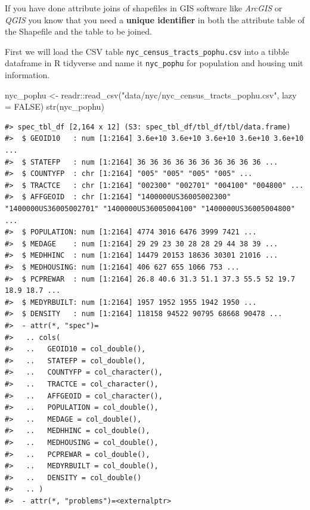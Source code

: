 \documentclass[
  11pt,
]{book}
\newenvironment{Shaded}{\begin{snugshade}}{\end{snugshade}}
\newcommand{\AttributeTok}[1]{\textcolor[rgb]{0.77,0.63,0.00}{#1}}
\newcommand{\ConstantTok}[1]{\textcolor[rgb]{0.00,0.00,0.00}{#1}}
\newcommand{\FunctionTok}[1]{\textcolor[rgb]{0.00,0.00,0.00}{#1}}
\newcommand{\NormalTok}[1]{#1}
\newcommand{\OtherTok}[1]{\textcolor[rgb]{0.56,0.35,0.01}{#1}}
\newcommand{\SpecialCharTok}[1]{\textcolor[rgb]{0.00,0.00,0.00}{#1}}
\newcommand{\StringTok}[1]{\textcolor[rgb]{0.31,0.60,0.02}{#1}}
\begin{document}
If you have done attribute joins of shapefiles in GIS software like \emph{ArcGIS} or \emph{QGIS} you know that you need a \textbf{unique identifier} in both the attribute table of the Shapefile and the table to be joined.

First we will load the CSV table \texttt{nyc\_census\_tracts\_pophu.csv} into a tibble dataframe in R tidyverse and name it \texttt{nyc\_pophu} for population and housing unit information.

\begin{Shaded}
\begin{Highlighting}[]
\NormalTok{nyc\_pophu }\OtherTok{\textless{}{-}}\NormalTok{ readr}\SpecialCharTok{::}\FunctionTok{read\_csv}\NormalTok{(}\StringTok{"data/nyc/nyc\_census\_tracts\_pophu.csv"}\NormalTok{, }\AttributeTok{lazy =} \ConstantTok{FALSE}\NormalTok{)}
\FunctionTok{str}\NormalTok{(nyc\_pophu)}
\end{Highlighting}
\end{Shaded}

\begin{verbatim}
#> spec_tbl_df [2,164 x 12] (S3: spec_tbl_df/tbl_df/tbl/data.frame)
#>  $ GEOID10   : num [1:2164] 3.6e+10 3.6e+10 3.6e+10 3.6e+10 3.6e+10 ...
#>  $ STATEFP   : num [1:2164] 36 36 36 36 36 36 36 36 36 36 ...
#>  $ COUNTYFP  : chr [1:2164] "005" "005" "005" "005" ...
#>  $ TRACTCE   : chr [1:2164] "002300" "002701" "004100" "004800" ...
#>  $ AFFGEOID  : chr [1:2164] "1400000US36005002300" "1400000US36005002701" "1400000US36005004100" "1400000US36005004800" ...
#>  $ POPULATION: num [1:2164] 4774 3016 6476 3999 7421 ...
#>  $ MEDAGE    : num [1:2164] 29 29 23 30 28 28 29 44 38 39 ...
#>  $ MEDHHINC  : num [1:2164] 14479 20153 18636 30301 21016 ...
#>  $ MEDHOUSING: num [1:2164] 406 627 655 1066 753 ...
#>  $ PCPREWAR  : num [1:2164] 26.8 40.6 31.3 51.1 37.3 55.5 52 19.7 18.9 18.7 ...
#>  $ MEDYRBUILT: num [1:2164] 1957 1952 1955 1942 1950 ...
#>  $ DENSITY   : num [1:2164] 118158 94522 90795 68668 90478 ...
#>  - attr(*, "spec")=
#>   .. cols(
#>   ..   GEOID10 = col_double(),
#>   ..   STATEFP = col_double(),
#>   ..   COUNTYFP = col_character(),
#>   ..   TRACTCE = col_character(),
#>   ..   AFFGEOID = col_character(),
#>   ..   POPULATION = col_double(),
#>   ..   MEDAGE = col_double(),
#>   ..   MEDHHINC = col_double(),
#>   ..   MEDHOUSING = col_double(),
#>   ..   PCPREWAR = col_double(),
#>   ..   MEDYRBUILT = col_double(),
#>   ..   DENSITY = col_double()
#>   .. )
#>  - attr(*, "problems")=<externalptr>
\end{verbatim}
\end{document}
